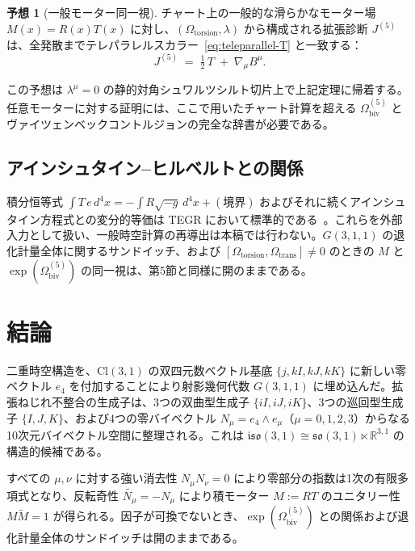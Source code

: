 \documentclass[dvipdfmx,11pt,a4paper]{article}
\theoremstyle{definition}
\newtheorem{conjecture}{予想}
\theoremstyle{plain}
\theoremstyle{remark}
\begin{document}
\begin{conjecture}[一般モーター同一視]
チャート上の一般的な滑らかなモーター場 $M(x)=R(x)T(x)$ に対し、$(\Omega_{\mathrm{torsion}},\lambda)$ から構成される拡張診断 $J^{(5)}$ は、全発散までテレパラレルスカラー~\eqref{eq:teleparallel-T} と一致する：
\begin{equation}
J^{(5)} \;=\; \tfrac12\, T \;+\; \nabla_{\mu}B^{\mu}.
\label{eq:J5-T-conjecture}
\end{equation}
\end{conjecture}

この予想は $\lambda^{\mu}=0$ の静的対角シュワルツシルト切片上で上記定理に帰着する。任意モーターに対する証明には、ここで用いたチャート計算を超える $\Omega_{\mathrm{biv}}^{(5)}$ とヴァイツェンベックコントルジョンの完全な辞書が必要である。

\subsection{アインシュタイン--ヒルベルトとの関係}

積分恒等式 $\int T\,e\,d^{4}x=-\int R\sqrt{-g}\,d^{4}x+(\text{境界})$ およびそれに続くアインシュタイン方程式との変分的等価は TEGR において標準的である~\cite{maluf2013}。これらを外部入力として扱い、一般時空計算の再導出は本稿では行わない。$G(3,1,1)$ の退化計量全体に関するサンドイッチ、および $[\Omega_{\mathrm{torsion}},\Omega_{\mathrm{trans}}]\neq0$ のときの $M$ と $\exp(\Omega_{\mathrm{biv}}^{(5)})$ の同一視は、第5節と同様に開のままである。

\section{結論}

二重時空構造を、$\mathrm{Cl}(3,1)$ の双四元数ベクトル基底 $\{j, kI, kJ, kK\}$ に新しい零ベクトル $e_{4}$ を付加することにより射影幾何代数 $G(3,1,1)$ に埋め込んだ。拡張ねじれ不整合の生成子は、3つの双曲型生成子 $\{iI,iJ,iK\}$、3つの巡回型生成子 $\{I,J,K\}$、および4つの零バイベクトル $N_{\mu}=e_{4}\wedge e_{\mu}$（$\mu=0,1,2,3$）からなる10次元バイベクトル空間に整理される。これは $\mathfrak{iso}(3,1)\cong\mathfrak{so}(3,1)\ltimes\mathbb{R}^{3,1}$ の構造的候補である。

すべての $\mu,\nu$ に対する強い消去性 $N_{\mu}N_{\nu}=0$ により零部分の指数は1次の有限多項式となり、反転奇性 $\widetilde{N_{\mu}}=-N_{\mu}$ により積モーター $M:=RT$ のユニタリー性 $M\widetilde{M}=1$ が得られる。因子が可換でないとき、$\exp(\Omega_{\mathrm{biv}}^{(5)})$ との関係および退化計量全体のサンドイッチは開のままである。
\end{document}
